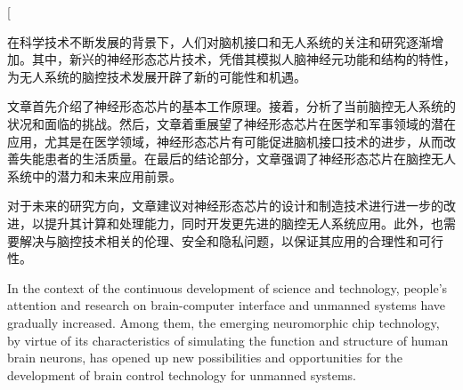 \documentclass{thuemp}
\begin{document}



\twocolumn[
\begin{@twocolumnfalse}
\maketitle

\begin{empAbstract}
  在科学技术不断发展的背景下，人们对脑机接口和无人系统的关注和研究逐渐增加。其中，新兴的神经形态芯片技术，凭借其模拟人脑神经元功能和结构的特性，为无人系统的脑控技术发展开辟了新的可能性和机遇。
  
  文章首先介绍了神经形态芯片的基本工作原理。接着，分析了当前脑控无人系统的状况和面临的挑战。然后，文章着重展望了神经形态芯片在医学和军事领域的潜在应用，尤其是在医学领域，神经形态芯片有可能促进脑机接口技术的进步，从而改善失能患者的生活质量。在最后的结论部分，文章强调了神经形态芯片在脑控无人系统中的潜力和未来应用前景。
  
  对于未来的研究方向，文章建议对神经形态芯片的设计和制造技术进行进一步的改进，以提升其计算和处理能力，同时开发更先进的脑控无人系统应用。此外，也需要解决与脑控技术相关的伦理、安全和隐私问题，以保证其应用的合理性和可行性。
\end{empAbstract}


\begin{empAbstractEn}
  In the context of the continuous development of science and technology, people's attention and research on brain-computer interface and unmanned systems have gradually increased. Among them, the emerging neuromorphic chip technology, by virtue of its characteristics of simulating the function and structure of human brain neurons, has opened up new possibilities and opportunities for the development of brain control technology for unmanned systems.
  

\end{empAbstractEn}
\end{@twocolumnfalse}
\end{document}
